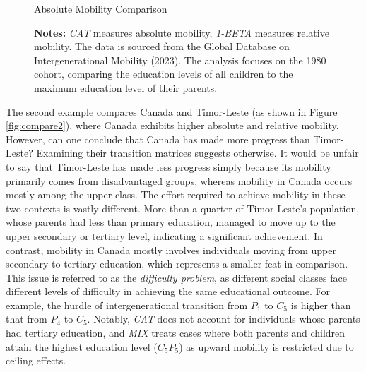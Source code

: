 \begin{figure}[!ht]
    \centering
    \caption{Absolute Mobility Comparison}
    \label{fig:compare1}
    \captionsetup{font=footnotesize}
    \caption*{\textbf{Notes:} \textit{CAT} measures absolute mobility, \textit{1-BETA} measures relative mobility. The data is sourced from the Global Database on Intergenerational Mobility (2023). The analysis focuses on the 1980 cohort, comparing the education levels of all children to the maximum education level of their parents.}
\end{figure}

The second example compares Canada and Timor-Leste (as shown in Figure \ref{fig:compare2}), where Canada exhibits higher absolute and relative mobility. However, can one conclude that Canada has made more progress than Timor-Leste? Examining their transition matrices suggests otherwise. It would be unfair to say that Timor-Leste has made less progress simply because its mobility primarily comes from disadvantaged groups, whereas mobility in Canada occurs mostly among the upper class. The effort required to achieve mobility in these two contexts is vastly different. More than a quarter of Timor-Leste’s population, whose parents had less than primary education, managed to move up to the upper secondary or tertiary level, indicating a significant achievement. In contrast, mobility in Canada mostly involves individuals moving from upper secondary to tertiary education, which represents a smaller feat in comparison. This issue is referred to as the \textit{difficulty problem}, as different social classes face different levels of difficulty in achieving the same educational outcome. For example, the hurdle of intergenerational transition from $P_1$ to $C_5$ is higher than that from $P_4$ to $C_5$. Notably, \textit{CAT} does not account for individuals whose parents had tertiary education, and \textit{MIX} treats cases where both parents and children attain the highest education level ($C_5P_5$) as upward mobility is restricted due to ceiling effects.

